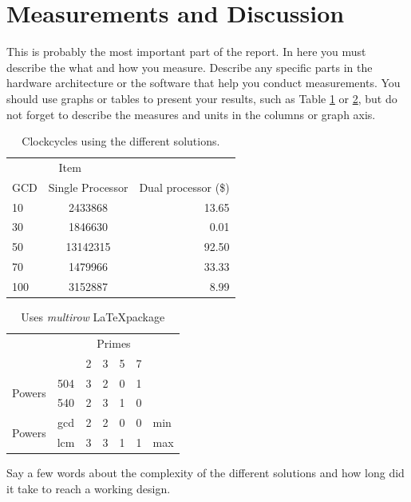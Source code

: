 \documentclass[11pt]{article}
\begin{document}
\section{Measurements and Discussion}
This is probably the most important part of the report. In here you must describe the what and how you measure. Describe any specific parts in the hardware architecture or the software that help you conduct measurements. You should use graphs or tables to present your results, such as Table \ref{tab:example} or \ref{tab:example2}, but do not forget to describe the measures and units in the columns or graph axis.

\begin{table}[htbp]
   \centering
   \begin{tabular}{@{} lcr @{}} %
      \toprule
      \multicolumn{2}{c}{Item} \\
      \cmidrule(r){1-2} %
	GCD    & Single Processor & Dual processor (\$)\\
      \midrule
      10      & 2433868 & 13.65 \\
      30           & 1846630    &  0.01 \\
      50       & 13142315 & 92.50 \\
      70       & 1479966 & 33.33 \\
      100 & 3152887   &  8.99 \\
      \bottomrule
   \end{tabular}
   \caption{Clockcycles using the different solutions.}
   \label{tab:example}
\end{table}

\begin{table}[htbp]
   \centering 
 \begin{tabular}{cc|c|c|c|c|l}
\cline{3-6}
& & \multicolumn{4}{|c|}{Primes} \\ \cline{3-6}
& & 2 & 3 & 5 & 7 \\ \cline{1-6}
\multicolumn{1}{|c|}{\multirow{2}{*}{Powers}} &
\multicolumn{1}{|c|}{504} & 3 & 2 & 0 & 1 &     \\ \cline{2-6}
\multicolumn{1}{|c|}{}                        &
\multicolumn{1}{|c|}{540} & 2 & 3 & 1 & 0 &     \\ \cline{1-6}
\multicolumn{1}{|c|}{\multirow{2}{*}{Powers}} &
\multicolumn{1}{|c|}{gcd} & 2 & 2 & 0 & 0 & min \\ \cline{2-6}
\multicolumn{1}{|c|}{}                        &
\multicolumn{1}{|c|}{lcm} & 3 & 3 & 1 & 1 & max \\ \cline{1-6}
\end{tabular}
  \caption{Uses \textit{multirow} \LaTeX package}
   \label{tab:example2}
\end{table}
Say a few words about the complexity of the different solutions and how long did it take to reach a working design.
 
\end{document}
